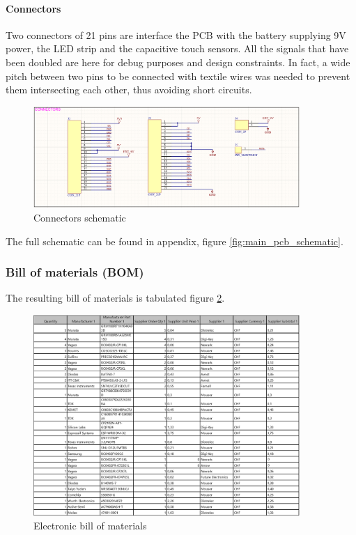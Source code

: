 \paragraph{Connectors} Two connectors of 21 pins are interface the PCB with the battery supplying 9V power, the LED strip and the capacitive touch sensors. All the signals that have been doubled are here for debug purposes and design constraints. In fact, a wide pitch between two pins to be connected with textile wires was needed to prevent them intersecting each other, thus avoiding short circuits.

\begin{figure}[H]
    \centering
    \includegraphics[width=0.9\textwidth]{images/EE_Connectors.PNG}
    \caption{Connectors schematic}
    \label{fig:connectors_schematic}
\end{figure}

The full schematic can be found in appendix, figure \ref{fig:main_pcb_schematic}.


\subsubsection{Bill of materials (BOM)}
\label{subsubsec:main_pcb/bill_of_materials} 

The resulting bill of materials is tabulated figure \ref{fig:BOM}. 

\begin{figure}[H]
    \centering
    \includegraphics[width=0.9\textwidth]{images/EE_BOM.png}
    \caption{Electronic bill of materials}
    \label{fig:BOM}
\end{figure}

